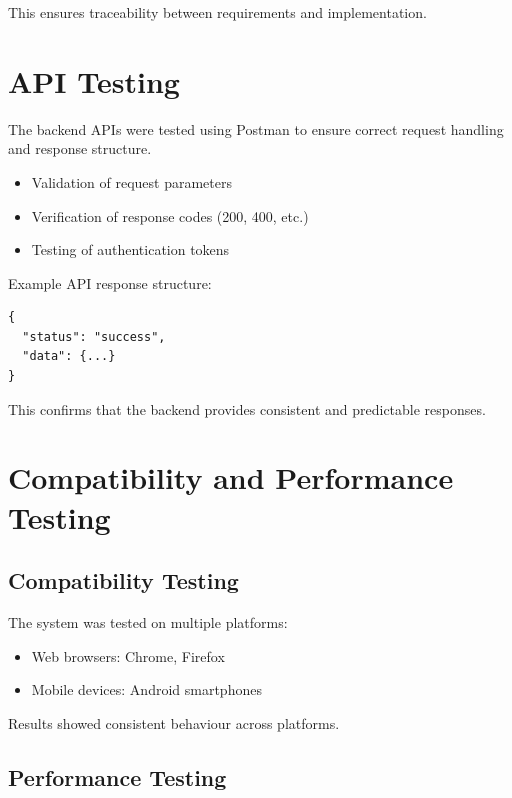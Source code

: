 This ensures traceability between requirements and implementation.

\section{API Testing}

The backend APIs were tested using Postman to ensure correct request handling and response structure.

\begin{itemize}[noitemsep]
    \item Validation of request parameters
    \item Verification of response codes (200, 400, etc.)
    \item Testing of authentication tokens
\end{itemize}

Example API response structure:

\begin{verbatim}
{
  "status": "success",
  "data": {...}
}
\end{verbatim}

This confirms that the backend provides consistent and predictable responses.

\section{Compatibility and Performance Testing}

\subsection{Compatibility Testing}

The system was tested on multiple platforms:

\begin{itemize}[noitemsep]
    \item Web browsers: Chrome, Firefox
    \item Mobile devices: Android smartphones
\end{itemize}

Results showed consistent behaviour across platforms.

\subsection{Performance Testing}


